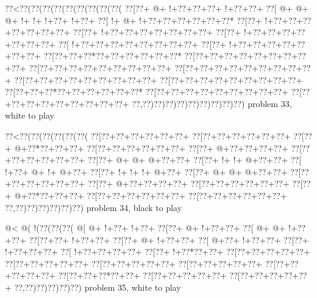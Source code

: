\vbox{\vbox{\goo
\0??<\0??(\0??(\0??(\0??(\0??(\0??(\0??(\0??(\0??(
\0??[\0??+\- @+\- !+\0??+\0??+\0??+\- !+\0??+\0??+
\0??[\- @+\- @+\- @+\- !+\- !+\- !+\0??+\- !+\0??+
\0??[\- !+\- @+\- !+\0??+\0??+\0??+\0??+\0??+\0??*
\0??[\0??+\- !+\0??+\0??+\0??+\0??+\0??+\0??+\0??+
\0??[\0??+\- !+\0??+\0??+\0??+\0??+\0??+\0??+\0??+
\0??[\0??+\- !+\0??+\0??+\0??+\0??+\0??+\0??+\0??+
\0??[\- !+\0??+\0??+\0??+\0??+\0??+\0??+\0??+\0??+
\0??[\0??+\- !+\0??+\0??+\0??+\0??+\0??+\0??+\0??+
\0??[\0??+\0??+\0??*\0??+\0??+\0??+\0??+\0??+\0??*
\0??[\0??+\0??+\0??+\0??+\0??+\0??+\0??+\0??+\0??+
\0??[\0??+\0??+\0??+\0??+\0??+\0??+\0??+\0??+\0??+
\0??[\0??+\0??+\0??+\0??+\0??+\0??+\0??+\0??+\0??+
\0??[\0??+\0??+\0??+\0??+\0??+\0??+\0??+\0??+\0??+
\0??[\0??+\0??+\0??+\0??+\0??+\0??+\0??+\0??+\0??+
\0??[\0??+\0??+\0??*\0??+\0??+\0??+\0??+\0??+\0??*
\0??[\0??+\0??+\0??+\0??+\0??+\0??+\0??+\0??+\0??+
\0??[\0??+\0??+\0??+\0??+\0??+\0??+\0??+\0??+\0??+
\0??,\0??)\0??)\0??)\0??)\0??)\0??)\0??)\0??)\0??)
}
\hfil problem 33, white to play\hfil\break
}

\vbox{\vbox{\goo
\0??<\0??(\0??(\0??(\0??(\0??(\0??(
\0??[\0??+\0??+\0??+\0??+\0??+\0??+
\0??[\0??+\0??+\0??+\0??+\0??+\0??+
\0??[\0??+\- @+\0??*\0??+\0??+\0??+
\0??[\0??+\0??+\0??+\0??+\0??+\0??+
\0??[\0??+\- @+\0??+\0??+\0??+\0??+
\0??[\0??+\0??+\0??+\0??+\0??+\0??+
\0??[\0??+\- @+\- @+\- @+\0??+\0??+
\0??[\0??+\- !+\- !+\- @+\0??+\0??+
\0??[\- !+\0??+\- @+\- !+\- @+\0??+
\0??[\0??+\- !+\- !+\- !+\- @+\0??+
\0??[\0??+\- @+\- @+\- @+\0??+\0??+
\0??[\0??+\0??+\0??+\0??+\0??+\0??+
\0??[\0??+\- @+\0??+\0??+\0??+\0??+
\0??[\0??+\0??+\0??+\0??+\0??+\0??+
\0??[\0??+\- @+\0??*\0??+\0??+\0??+
\0??[\0??+\0??+\0??+\0??+\0??+\0??+
\0??[\0??+\0??+\0??+\0??+\0??+\0??+
\0??,\0??)\0??)\0??)\0??)\0??)\0??)
}
\hfil problem 34, black to play\hfil\break
}

\vbox{\vbox{\goo
\- @<\- @(\- !(\0??(\0??(\0??(
\- @[\- @+\- !+\0??+\- !+\0??+
\0??[\0??+\- @+\- !+\0??+\0??+
\0??[\- @+\- @+\- !+\0??+\0??+
\0??[\0??+\0??+\- !+\0??+\0??+
\0??[\0??+\- @+\- !+\0??+\0??+
\0??[\- @+\0??+\- !+\0??+\0??+
\0??[\0??+\- !+\0??+\0??+\0??+
\0??[\- !+\0??+\0??+\0??+\0??+
\0??[\0??+\- !+\0??*\0??+\0??+
\0??[\0??+\0??+\0??+\0??+\0??+
\0??[\0??+\0??+\0??+\0??+\0??+
\0??[\0??+\0??+\0??+\0??+\0??+
\0??[\0??+\0??+\0??+\0??+\0??+
\0??[\0??+\0??+\0??+\0??+\0??+
\0??[\0??+\0??+\0??*\0??+\0??+
\0??[\0??+\0??+\0??+\0??+\0??+
\0??[\0??+\0??+\0??+\0??+\0??+
\0??,\0??)\0??)\0??)\0??)\0??)
}
\hfil problem 35, white to play\hfil\break
}

